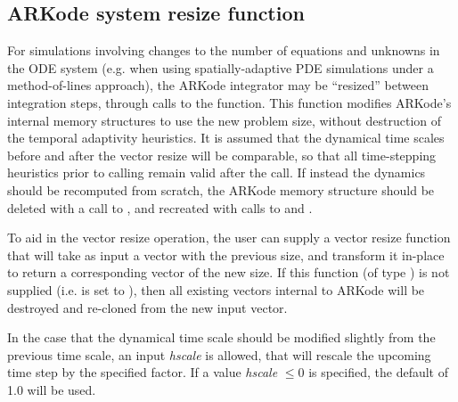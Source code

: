 \documentclass[letterpaper,10pt,english]{sphinxmanual}
\begin{document}
\subsection{ARKode system resize function}
\label{c_interface/User_callable:arkode-system-resize-function}\label{c_interface/User_callable:cinterface-resizing}
For simulations involving changes to the number of equations and
unknowns in the ODE system (e.g. when using spatially-adaptive
PDE simulations under a method-of-lines approach), the ARKode
integrator may be ``resized'' between integration steps, through calls
to the {\hyperref[c_interface/User_callable:c.ARKodeResize]{\emph{}}} function. This function modifies
ARKode's internal memory structures to use the new problem size,
without destruction of the temporal adaptivity heuristics.  It is
assumed that the dynamical time scales before and after the vector
resize will be comparable, so that all time-stepping heuristics prior
to calling {\hyperref[c_interface/User_callable:c.ARKodeResize]{\emph{}}} remain valid after the call.  If
instead the dynamics should be recomputed from scratch, the ARKode
memory structure should be deleted with a call to
{\hyperref[c_interface/User_callable:c.ARKodeFree]{\emph{}}}, and recreated with calls to
{\hyperref[c_interface/User_callable:c.ARKodeCreate]{\emph{}}} and {\hyperref[c_interface/User_callable:c.ARKodeInit]{\emph{}}}.

To aid in the vector resize operation, the user can supply a vector
resize function that will take as input a vector with the previous
size, and transform it in-place to return a corresponding vector of
the new size.  If this function (of type {\hyperref[c_interface/User_supplied:c.ARKVecResizeFn]{\emph{}}})
is not supplied (i.e. is set to ), then all existing vectors
internal to ARKode will be destroyed and re-cloned from the new input
vector.

In the case that the dynamical time scale should be modified slightly
from the previous time scale, an input \emph{hscale} is allowed, that will
rescale the upcoming time step by the specified factor.  If a value
\emph{hscale} \(\le 0\) is specified, the default of 1.0 will be used.
\end{document}
